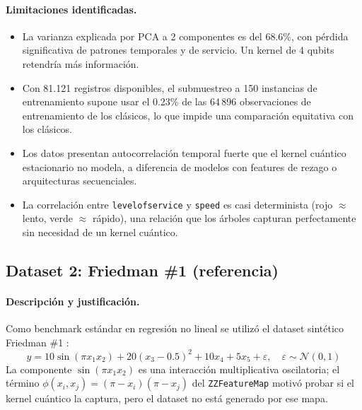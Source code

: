 \paragraph{Limitaciones identificadas.}
\begin{itemize}
  \item La varianza explicada por PCA a 2 componentes es del 68.6\%, con pérdida significativa de patrones temporales y de servicio. Un kernel de 4 qubits retendría más información.
  \item Con 81.121 registros disponibles, el submuestreo a 150 instancias de entrenamiento supone usar el 0.23\% de las 64\,896 observaciones de entrenamiento de los clásicos, lo que impide una comparación equitativa con los clásicos.
  \item Los datos presentan autocorrelación temporal fuerte que el kernel cuántico estacionario no modela, a diferencia de modelos con features de rezago o arquitecturas secuenciales.
  \item La correlación entre \texttt{levelofservice} y \texttt{speed} es casi determinista (rojo $\approx$ lento, verde $\approx$ rápido), una relación que los árboles capturan perfectamente sin necesidad de un kernel cuántico.
\end{itemize}

\subsection{Dataset 2: Friedman \#1 (referencia)}
\label{sec:friedman}

\paragraph{Descripción y justificación.}
Como benchmark estándar en regresión no lineal se utilizó el dataset sintético Friedman \#1 \citep{friedman1991}:
\begin{equation}
  y = 10\sin(\pi x_1 x_2) + 20(x_3 - 0.5)^2 + 10x_4 + 5x_5 + \varepsilon, \quad \varepsilon \sim \mathcal{N}(0, 1)
\end{equation}
La componente $\sin(\pi x_1 x_2)$ es una interacción multiplicativa oscilatoria; el término $\phi(x_i,x_j)=(\pi-x_i)(\pi-x_j)$ del \texttt{ZZFeatureMap} motivó probar si el kernel cuántico la captura, pero el dataset no está generado por ese mapa.

